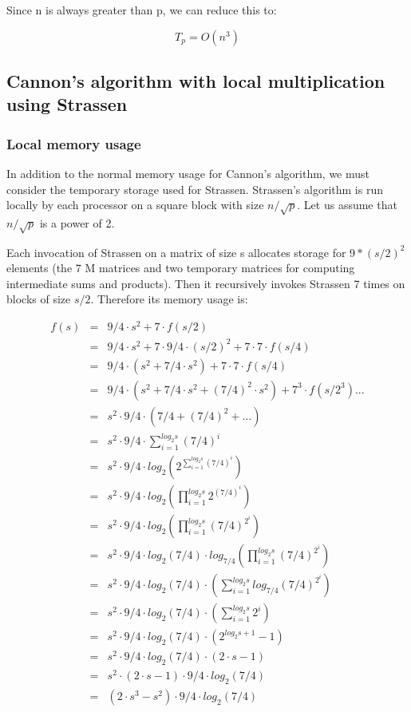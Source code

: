 \documentclass{article}
\begin{document}
Since n is always greater than p, we can reduce this to:

$$T_p = O(n^3)$$

\subsection{Cannon's algorithm with local multiplication using Strassen}

\subsubsection{Local memory usage}

In addition to the normal memory usage for Cannon's algorithm, we must consider
the temporary storage used for Strassen. Strassen's algorithm is run locally by
each processor on a square block with size $n/\sqrt{p}$. Let us assume that
$n/\sqrt{p}$ is a power of 2.

Each invocation of Strassen on a matrix of size s allocates storage for
$9*(s/2)^2$ elements (the 7 M matrices and two temporary matrices for computing
intermediate sums and products). Then it recursively invokes Strassen 7 times on
blocks of size $s/2$. Therefore its memory usage is:

\begin{eqnarray*}
f(s) &=& 9/4\cdot s^2 + 7\cdot f(s/2)	\\
&=& 9/4\cdot  s^2 + 7\cdot  9/4\cdot  (s/2)^2 + 7\cdot  7\cdot  f(s/4)	\\
&=& 9/4\cdot  (s^2 + 7/4\cdot  s^2) + 7\cdot  7\cdot  f(s/4)	\\
&=& 9/4\cdot  ( s^2 + 7/4\cdot  s^2 + (7/4)^2\cdot  s^2 ) +7^3\cdot  f(s/2^3) ... 	\\
&=& s^2 \cdot   9/4 \cdot   (7/4 + (7/4)^2 + \dots)	\\
&=& s^2 \cdot   9/4 \cdot   \sum\limits_{i=1}^{log_2 s} (7/4)^i 	\\
&=& s^2 \cdot   9/4 \cdot   log_2(2^{\sum\limits_{i=1}^{log_2 s} (7/4)^i}) 	\\
&=& s^2 \cdot   9/4 \cdot   log_2(\prod\limits_{i=1}^{log_2 s} 2^{(7/4)^i}) 	\\
&=& s^2 \cdot   9/4 \cdot   log_2(\prod\limits_{i=1}^{log_2 s} (7/4)^{2^i}) 	\\
&=& s^2 \cdot   9/4 \cdot   log_2(7/4) \cdot   log_{7/4}(\prod\limits_{i=1}^{log_2 s} (7/4)^{2^i}) 	\\
&=& s^2 \cdot   9/4 \cdot   log_2(7/4) \cdot   (\sum\limits_{i=1}^{log_2 s} log_{7/4}(7/4)^{2^i}) 	\\
&=& s^2 \cdot   9/4 \cdot   log_2(7/4) \cdot   (\sum\limits_{i=1}^{log_2 s} 2^i) 	\\
&=& s^2 \cdot   9/4 \cdot   log_2(7/4) \cdot   (2^{log_2 s+1} - 1) 	\\
&=& s^2 \cdot   9/4 \cdot   log_2(7/4) \cdot   (2\cdot  s - 1) 	\\
&=& s^2 \cdot   (2\cdot  s - 1) \cdot   9/4 \cdot   log_2(7/4) 	\\
&=& (2\cdot  s^3 - s^2) \cdot   9/4 \cdot   log_2(7/4)
\end{eqnarray*}
\end{document}
